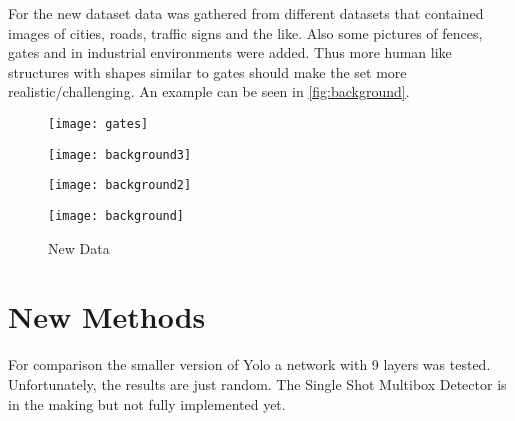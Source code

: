 \documentclass{article}
\begin{document}
For the new dataset data was gathered from different datasets that contained images of cities, roads, traffic signs and the like. Also some pictures of fences, gates and in industrial environments were added. Thus more human like structures with shapes similar to gates should make the set more realistic/challenging. An example can be seen in \autoref{fig:background}. 

\begin{figure}[h]
	\centering
	\begin{minipage}{0.24\textwidth}
		\centering
		\texttt{[image: gates]}

		\label{fig:gates}
	\end{minipage}
	\begin{minipage}{0.24\textwidth}
		\centering
		\texttt{[image: background3]}
	\end{minipage}
	\begin{minipage}{0.24\textwidth}
		\centering
		\texttt{[image: background2]}
	\end{minipage}
		\begin{minipage}{0.24\textwidth}
			\centering
			\texttt{[image: background]}
		\end{minipage}
	\caption{New Data}
			\label{fig:background}
\end{figure}

\section{New Methods}

For comparison the smaller version of Yolo a network with 9 layers was tested. Unfortunately, the results are just random. The Single Shot Multibox Detector \cite{Liu} is in the making but not fully implemented yet.
\end{document}

